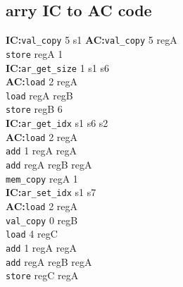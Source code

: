 \documentclass[10pt,landscape]{article}
\begin{document}
\begin{multicols}{3}
	\begin{minipage}{0.2 	\textwidth}
		\subsection{arry IC to AC code}
		\textbf{IC:}\verb!val_copy! 5 s1 
		\textbf{AC:}\verb!val_copy! 5 regA \\
		\verb!store! regA 1\\
		
		\textbf{IC:}\verb!ar_get_size! 1 s1 s6 \\
		\textbf{AC:}\verb!load! 2 regA\\
		\verb!load! regA regB\\
		\verb!store! regB 6\\
		
		\textbf{IC:}\verb!ar_get_idx! s1 s6 s2 \\
		\textbf{AC:}\verb!load! 2 regA\\
		\verb!add! 1 regA regA\\
		\verb!add! regA regB regA\\
		\verb!mem_copy! regA 1\\
		
		\textbf{IC:}\verb!ar_set_idx! s1 s7 \\
		\textbf{AC:}\verb!load! 2 regA\\
		\verb!val_copy! 0 regB \\
		\verb!load! 4 regC\\
		\verb!add! 1 regA regA\\
		\verb!add! regA regB regA\\
		\verb!store! regC regA\\
		

\end{minipage}
\end{multicols}
\end{document}
